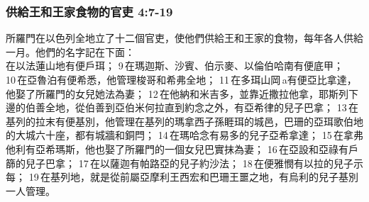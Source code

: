 \subsubsection{供給王和王家食物的官吏 4:7-19} 
所羅門在以色列全地立了十二個官吏，使他們供給王和王家的食物，每年各人供給一月。他們的名字記在下面：\\
在以法蓮山地有便戶珥； 9 在瑪迦斯、沙賓、伯示麥、以倫伯哈南有便底甲； 10 在亞魯泊有便希悉，他管理梭哥和希弗全地； 11 在多珥山岡 a有便亞比拿達，他娶了所羅門的女兒她法為妻； 12 在他納和米吉多，並靠近撒拉他拿，耶斯列下邊的伯善全地，從伯善到亞伯米何拉直到約念之外，有亞希律的兒子巴拿； 13 在基列的拉末有便基別，他管理在基列的瑪拿西子孫睚珥的城邑，巴珊的亞珥歌伯地的大城六十座，都有城牆和銅閂； 14 在瑪哈念有易多的兒子亞希拿達； 15 在拿弗他利有亞希瑪斯，他也娶了所羅門的一個女兒巴實抹為妻； 16 在亞設和亞祿有戶篩的兒子巴拿； 17 在以薩迦有帕路亞的兒子約沙法； 18 在便雅憫有以拉的兒子示每； 19 在基列地，就是從前屬亞摩利王西宏和巴珊王噩之地，有烏利的兒子基別一人管理。

\newpage
